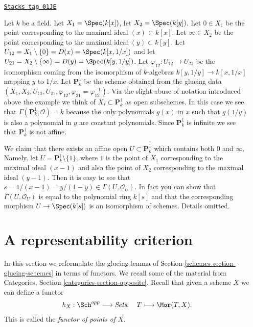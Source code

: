 \begin{example}

\label{schemes-example-projective-line}
\href{https://stacks.math.columbia.edu/tag/01JE}{\texttt{Stacks tag 01JE}}

Let $k$ be a field.
Let $X_1 = \Spec(k[x])$,
let $X_2 = \Spec(k[y])$.
Let $0 \in X_1$ be the point corresponding to the maximal ideal
$(x) \subset k[x]$.
Let $\infty \in X_2$ be the point corresponding to the maximal ideal
$(y) \subset k[y]$.
Let $U_{12} = X_1 \setminus \{0\} = D(x) = \Spec(k[x, 1/x])$ and
let $U_{21} = X_2 \setminus \{\infty\} = D(y) = \Spec(k[y, 1/y])$.
Let $\varphi_{12} : U_{12} \to U_{21}$ be the isomorphism
coming from the isomorphism of $k$-algebras
$k[y, 1/y] \to k[x, 1/x]$ mapping $y$ to $1/x$.
Let $\mathbf{P}^1_k$ be the scheme obtained from the glueing data
$(X_1, X_2, U_{12}, U_{21}, \varphi_{12},
\varphi_{21} = \varphi_{12}^{-1})$. Via the slight abuse
of notation introduced above the example we think of
$X_i \subset \mathbf{P}^1_k$ as open subschemes. In this case
we see that $\Gamma(\mathbf{P}^1_k, \mathcal{O}) = k$ because the
only polynomials $g(x)$ in $x$ such that $g(1/y)$ is
also a polynomial in $y$ are constant polynomials.
Since $\mathbf{P}^1_k$ is infinite we see that $\mathbf{P}^1_k$ is not affine.

\medskip\noindent
We claim that there exists an affine open $U \subset \mathbf{P}^1_k$
which contains both $0$ and $\infty$. Namely, let
$U = \mathbf{P}^1_k \setminus \{1\}$, where $1$ is the point
of $X_1$ corresponding to the maximal ideal $(x - 1)$
and also the point of $X_2$ corresponding to the
maximal ideal $(y - 1)$. Then it is easy to see that
$s = 1/(x - 1) = y/(1 - y) \in \Gamma(U, \mathcal{O}_U)$.
In fact you can show that $\Gamma(U, \mathcal{O}_U)$
is equal to the polynomial ring $k[s]$ and that the
corresponding morphism $U \to \Spec(k[s])$ is
an isomorphism of schemes. Details omitted.
\end{example}

\section{A representability criterion}
\label{schemes-section-representable}
In this section we reformulate the glueing lemma
of Section \ref{schemes-section-glueing-schemes} in terms
of functors. We recall some of the material from
Categories, Section \ref{categories-section-opposite}.
Recall that given a scheme $X$ we
can define a functor
$$
h_X : \Sch^{opp}
\longrightarrow
\textit{Sets}, \quad
T \longmapsto \Mor(T, X).
$$
This is called the {\it functor of points of $X$}.

